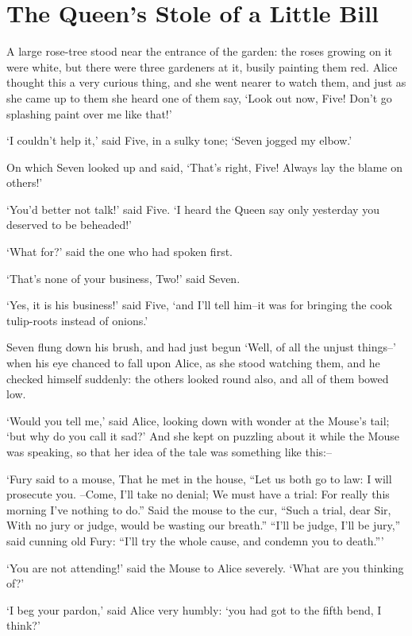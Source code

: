 \documentclass[statementpaper,twoside,openany]{memoir}
\begin{document}
\chapter{The Queen's Stole of a Little Bill}

A large rose-tree stood near the entrance of the garden: the roses growing on it were white, but there were three gardeners at it, busily painting them red. Alice thought this a very curious thing, and she went nearer to watch them, and just as she came up to them she heard one of them say, `Look out now, Five! Don't go splashing paint over me like that!'

`I couldn't help it,' said Five, in a sulky tone; `Seven jogged my elbow.'

On which Seven looked up and said, `That's right, Five! Always lay the blame on others!'

`You'd better not talk!' said Five. `I heard the Queen say only yesterday you deserved to be beheaded!'

`What for?' said the one who had spoken first.

`That's none of your business, Two!' said Seven.

`Yes, it is his business!' said Five, `and I'll tell him--it was for bringing the cook tulip-roots instead of onions.'

Seven flung down his brush, and had just begun `Well, of all the unjust things--' when his eye chanced to fall upon Alice, as she stood watching them, and he checked himself suddenly: the others looked round also, and all of them bowed low.

`Would you tell me,' said Alice, looking down with wonder at the Mouse's tail; `but why do you call it sad?' And she kept on puzzling about it while the Mouse was speaking, so that her idea of the tale was something like this:--

`Fury said to a mouse, That he met in the house, ``Let us both go to law: I will prosecute you. --Come, I'll take no denial; We must have a trial: For really this morning I've nothing to do.'' Said the mouse to the cur, ``Such a trial, dear Sir, With no jury or judge, would be wasting our breath.'' ``I'll be judge, I'll be jury,'' said cunning old Fury: ``I'll try the whole cause, and condemn you to death.'''

`You are not attending!' said the Mouse to Alice severely. `What are you thinking of?'

`I beg your pardon,' said Alice very humbly: `you had got to the fifth bend, I think?'
\end{document}
